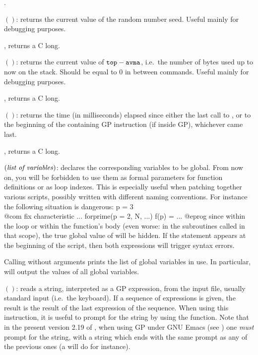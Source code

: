 .

$()$: returns the current value of the random number
seed. Useful mainly for debugging purposes.

, returns a C long.

$()$: returns the current value of
${\tt top}-{\tt avma}$, i.e.~the number of bytes used up to now on the stack.
Should be equal to $0$ in between commands. Useful mainly for debugging
purposes.

, returns a C long.

$()$: returns the time (in milliseconds) elapsed since
either the last call to , or to the beginning of the containing
GP instruction (if inside GP), whichever came last.

, returns a C long.

$(\hbox{\it list of variables\/})$: \label{se:global}
declares the corresponding variables to be global. From now on, you will be
forbidden to use them as formal parameters for function definitions or as
loop indexes. This is especially useful when patching together various
scripts, possibly written with different naming conventions. For instance the
following situation is dangerous:
%
\bprog
p = 3   \\@com fix characteristic
...
forprime(p = 2, N, ...)
f(p) = ...
@eprog
since within the loop or within the function's body (even worse: in the
subroutines called in that scope), the true global value of  will be
hidden. If the statement  appears at the beginning of
the script, then both expressions will trigger syntax errors.

Calling  without arguments prints the list of global variables in
use. In particular,  will output the values of all global
variables.

$()$: reads a string, interpreted as a GP expression,
from the input file, usually standard input (i.e.~the keyboard). If a
sequence of expressions is given, the result is the result of the last
expression of the sequence. When using this instruction, it is useful to
prompt for the string by using the  function. Note that in the
present version 2.19 of , when using GP under GNU Emacs (see
) one \emph{must} prompt for the string, with a string
which ends with the same prompt as any of the previous ones (a 
will do for instance).

